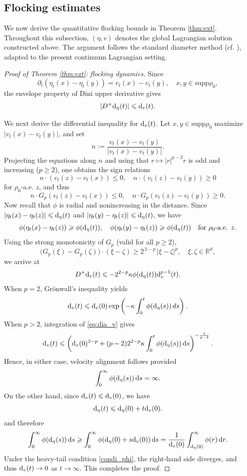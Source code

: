 \documentclass[10pt,reqno]{amsart}
\renewcommand{\ge}{\geqslant}
\renewcommand{\leq}{\leqslant}
\renewcommand{\le}{\leqslant}
\numberwithin{equation}{section}
\newcommand{\R}{\mathbb R}
\newcommand{\bq}{\begin{equation}}
\newcommand{\eq}{\end{equation}}
\newcommand{\lt}{\left}
\newcommand{\rt}{\right}
\newcommand{\pa}{\partial}
\newcommand{\rd}{\textnormal{d}}
\newcommand{\dr}{\textnormal{d}r}
\newcommand{\ds}{\textnormal{d}s}
\newcommand{\supp}{\text{supp}}
\begin{document}
%
%
%                      
%
%
 

 
 
\subsection{Flocking estimates}%

We now derive the quantitative flocking bounds in Theorem \ref{thm:ext}. Throughout this subsection, $(\eta,v)$ denotes the global Lagrangian solution constructed above. The argument follows the standard diameter method (cf.  \cite{BT24,CCH14,HHK10,NSTpre}), adapted to the present continuum Lagrangian setting.

  
\begin{proof}[Proof of Theorem \ref{thm:ext}: flocking dynamics]  
 Since 
 \[
 \pa_t (\eta_t(x) - \eta_t(y)) = v_t(x) - v_t(y), \quad x,y \in \supp \rho_0,
 \]
the envelope property of Dini upper derivative gives
 \[
 |D^+ \rd_\eta(t)| \leq \rd_v(t).
 \]
 
We next derive the differential inequality for $\rd_v(t)$. Let $x,y \in \supp \rho_0$ maximize $|v_t(x)-v_t(y)|$, and set 
\[
n := \frac{v_t(x) - v_t(y)}{|v_t(x) - v_t(y)|}.
\]
Projecting the equations along $n$ and using that $r\mapsto|r|^{p-2}r$ is odd and increasing ($p\ge2$), one obtains the sign relations
\[
n \cdot (v_t(z)-v_t(x))\le0, \quad n  \cdot (v_t(z)-v_t(y))\ge0 
\]
for $\rho_0$-a.e. $z$, and thus
\[
n \cdot G_p(v_t(z)-v_t(x))\le0,\quad n \cdot G_p(v_t(z)-v_t(y))\ge0.
\]
Now recall that $\phi$ is radial and nonincreasing in the distance. Since $|\eta_t(x)-\eta_t(z)|\le\rd_\eta(t)$ and $|\eta_t(y)-\eta_t(z)|\le\rd_\eta(t)$, we have
\[
\phi(\eta_t(x)-\eta_t(z)) \ge \phi(\rd_\eta(t)),\quad \phi(\eta_t(y)-\eta_t(z)) \ge \phi(\rd_\eta(t)) \quad\text{for $\rho_0$-a.e. }z.
\]
Using the strong monotonicity of $G_p$ (valid for all $p\ge2$),
\[
\big(G_p(\xi)-G_p(\zeta)\big) \cdot(\xi-\zeta) \ge  2^{\,2-p}\,|\xi-\zeta|^p, \quad \xi,\zeta\in\R^d,
\]
we arrive at
\bq\label{eq:dia_v}
D^+ \rd_v(t) \leq - 2^{2-p}\kappa\phi(\rd_\eta(t))\rd_v^{p-1}(t).
\eq
When $p=2$, Gr\"onwall's inequality yields
\[
\rd_v(t)\le \rd_v(0)\exp\left(-\kappa\int_0^t \phi(\rd_\eta(s))\,ds\right).
\]
When $p>2$, integration of \eqref{eq:dia_v} gives
\[
\rd_v(t) \le \lt(\rd_v(0)^{2-p} + (p-2)2^{2-p}\kappa \int_0^t \phi(\rd_\eta(s))\,\ds\rt)^{-\frac1{p-2}}. 
\]
Hence, in either case, velocity alignment follows provided
\[
\int_0^\infty \phi(\rd_\eta(s))\,\ds = \infty.
\]
On the other hand, since $\rd_v(t)\le \rd_v(0)$, we have
 \[
 \rd_\eta(t)\le \rd_\eta(0)+t \rd_v(0).
 \]
and therefore
\[
\int_0^\infty \phi(\rd_\eta(s))\,\ds \ge \int_0^\infty \phi (\rd_\eta(0)+s \rd_v(0))\,\ds = \frac1{\rd_v(0)}\int_{\rd_\eta(0)}^\infty \phi(r)\,\dr.
\]
Under the heavy-tail condition \eqref{condi_phi}, the right-hand side diverges, and thus $\rd_v(t)\to0$ as $t\to\infty$. This completes the proof.
 \end{proof}
 
\end{document}
